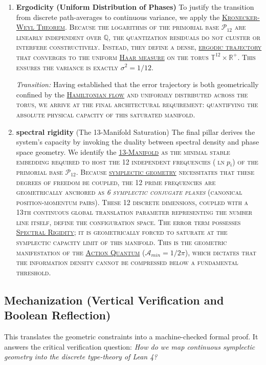 \documentclass[sn-mathphys-num, pdflatex]{sn-jnl}
\newcommand{\gterm}[2]{\begingroup\normalfont\scshape\hyperlink{#1}{#2}\endgroup}
\begin{document}
\begin{enumerate}
    \item \textbf{Ergodicity (Uniform Distribution of Phases)}
    To justify the transition from discrete path-averages to continuous variance, we apply the \gterm{weyl}{Kronecker-Weyl Theorem}. Because the logarithms of the primorial base $\mathcal{P}_{12}$ are linearly independent over $\mathbb{Q}$, the quantization residuals do not cluster or interfere constructively. Instead, they define a dense, \gterm{ergodic}{ergodic trajectory} that converges to the uniform \gterm{haar}{Haar measure} on the torus $\mathbb{T}^{12} \times \mathbb{R}^+$. This ensures the variance is exactly $\sigma^2 = 1/12$.

    \noindent\textit{Transition:} Having established that the error trajectory is both geometrically confined by the \gterm{hamiltonian}{Hamiltonian flow} and uniformly distributed across the torus, we arrive at the final architectural requirement: quantifying the absolute physical capacity of this saturated manifold.

    \item \textbf{spectral rigidity} (The 13-Manifold Saturation)
    The final pillar derives the system's capacity by invoking the duality between spectral density and phase space geometry. We identify the \gterm{m13}{13-Manifold} as the minimal stable embedding required to host the 12 independent frequencies ($\ln p_i$) of the primorial base $\mathcal{P}_{12}$. Because \gterm{geometry}{symplectic geometry} necessitates that these degrees of freedom be coupled, the 12 prime frequencies are geometrically anchored as \textit{6 symplectic conjugate planes} (canonical position-momentum pairs). These 12 discrete dimensions, coupled with a 13th continuous global translation parameter representing the number line itself, define the configuration space. The error term possesses \gterm{spectral}{Spectral Rigidity}; it is geometrically forced to saturate at the symplectic capacity limit of this manifold. This is the geometric manifestation of the \gterm{action_quantum}{Action Quantum} ($\mathcal{A}_{min} = 1/2\pi$), which dictates that the information density cannot be compressed below a fundamental threshold.
\end{enumerate}
    \subsection{Mechanization (Vertical Verification and Boolean Reflection)} 
    This translates the geometric constraints into a machine-checked formal proof. It answers the critical verification question: \textit{How do we map continuous symplectic geometry into the discrete type-theory of Lean 4?}
\end{document}
